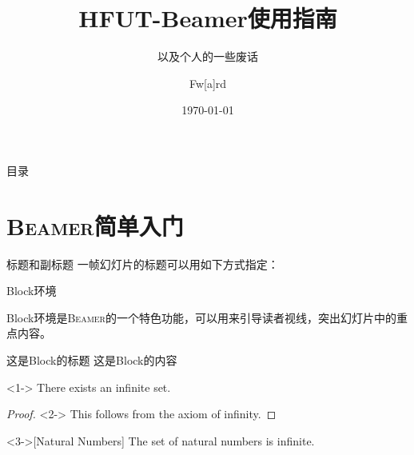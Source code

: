 \documentclass[aspectratio=169]{beamer}
\title{HFUT-Beamer使用指南}
\subtitle{以及个人的一些废话}
\author{Fw[a]rd}
\institute{HFUT \TeX{} User Group}
\date{\today}
\newcommand{\Beamer}{\textsc{Beamer}}
\begin{document}
\begin{frame}
	\maketitle
\end{frame}

\begin{frame}{目录}
	\tableofcontents
\end{frame}

\section{\Beamer{}简单入门}

\begin{frame}[fragile]{标题}{和副标题}
一帧幻灯片的标题可以用如下方式指定：

\end{frame}

\begin{frame}{Block环境}

Block环境是\Beamer{}的一个特色功能，可以用来引导读者视线，突出幻灯片中的重点内容。

\begin{block}{这是Block的标题}
	这是Block的内容
\end{block}

\begin{theorem}<1->
There exists an infinite set.
\end{theorem}

\begin{proof}<2->
This follows from the axiom of infinity.
\end{proof}

\begin{example}<3->[Natural Numbers]
The set of natural numbers is infinite.
\end{example}

\end{frame}
\end{document}
